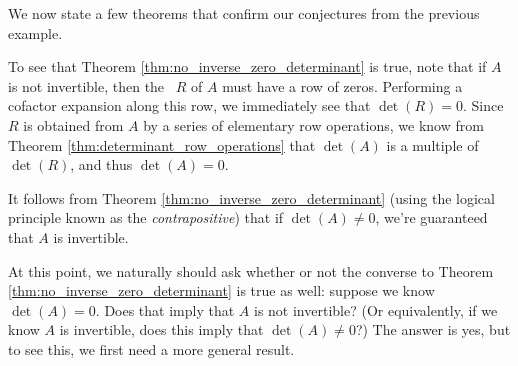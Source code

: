 \medskip


We now state a few theorems that confirm our conjectures from the previous example. 

\smallskip


\smallskip

To see that Theorem \ref{thm:no_inverse_zero_determinant} is true, note that if $A$ is not invertible, then the \rref\ $R$ of $A$ must have a row of zeros. Performing a cofactor expansion along this row, we immediately see that $\det(R)=0$. Since $R$ is obtained from $A$ by a series of elementary row operations, we know from Theorem \ref{thm:determinant_row_operations} that $\det(A)$ is a multiple of $\det(R)$, and thus $\det(A)=0$.

It follows from Theorem \ref{thm:no_inverse_zero_determinant} (using the logical principle known as the \textit{contrapositive})  that if $\det(A)\neq 0$, we're guaranteed that $A$ is invertible.

At this point, we naturally should ask whether or not the converse to Theorem \ref{thm:no_inverse_zero_determinant} is true as well: suppose we know $\det(A)=0$. Does that imply that $A$ is not invertible? (Or equivalently, if we know $A$ is invertible, does this imply that $\det(A)\neq 0$?) The answer is yes, but to see this, we first need a more general result.

\smallskip


